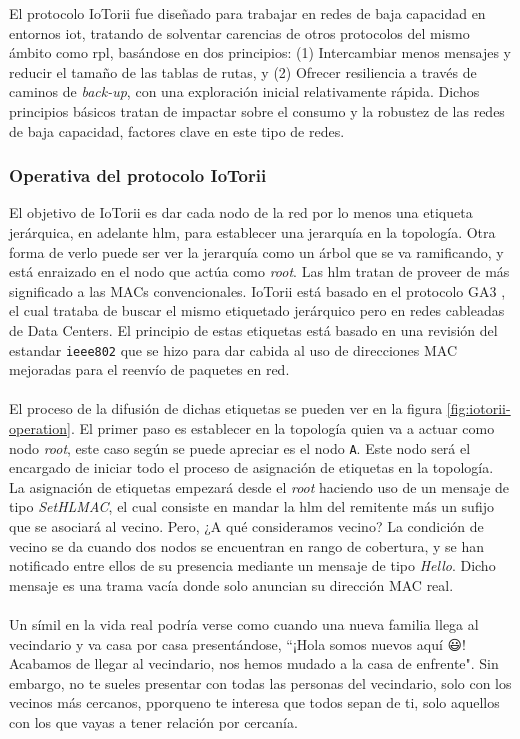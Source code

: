 El protocolo IoTorii fue diseñado para trabajar en redes de baja capacidad en entornos \gls{iot}, tratando de solventar carencias de otros protocolos del mismo ámbito como \gls{rpl}, basándose en dos principios: (1) Intercambiar menos mensajes y reducir el tamaño de las tablas de rutas, y (2) Ofrecer resiliencia a través de caminos de \textit{back-up}, con una exploración inicial relativamente rápida. Dichos principios básicos tratan de impactar sobre el consumo y la robustez de las redes de baja capacidad, factores clave en este tipo de redes.


\subsubsection{Operativa del protocolo IoTorii}

El objetivo de IoTorii es dar cada nodo de la red por lo menos una etiqueta jerárquica, en adelante \gls{hlm}, para establecer una jerarquía en la topología. Otra forma de verlo puede ser ver la jerarquía como un árbol que se va ramificando, y está enraizado en el nodo que actúa como \textit{root}. Las \gls{hlm} tratan de proveer de más significado a las MACs convencionales. IoTorii está basado en el protocolo GA3 \cite{rojas2017ga3}, el cual trataba de buscar el mismo etiquetado jerárquico pero en redes cableadas de Data Centers. El principio de estas etiquetas está basado en una revisión del estandar \texttt{ieee802} que se hizo para dar cabida al uso de direcciones MAC mejoradas para el reenvío de paquetes en red.\\
\\
El proceso de la difusión de dichas etiquetas se pueden ver en la figura \ref{fig:iotorii-operation}. El primer paso es establecer en la topología quien va a actuar como nodo \textit{root}, este caso según se puede apreciar es el nodo \texttt{A}. Este nodo será el encargado de iniciar todo el proceso de asignación de etiquetas en la topología. La asignación de etiquetas empezará desde el \textit{root} haciendo uso de un mensaje de tipo \textit{SetHLMAC}, el cual consiste en mandar la \gls{hlm} del remitente más un sufijo que se asociará al vecino. Pero, ¿A qué consideramos vecino? La condición de vecino se da cuando dos nodos se encuentran en rango de cobertura, y se han notificado entre ellos de su presencia mediante un mensaje de tipo \textit{Hello}. Dicho mensaje es una trama vacía donde solo anuncian su dirección MAC real. \\
\\
Un símil en la vida real podría verse como cuando una nueva familia llega al vecindario y va casa por casa presentándose, ``¡Hola somos nuevos aquí {\DejaSans 😃}! Acabamos de llegar al vecindario, nos hemos mudado a la casa de enfrente". Sin embargo, no te sueles presentar con todas las personas del vecindario, solo con los vecinos más cercanos, pporqueno te interesa que todos sepan de ti, solo aquellos con los que vayas a tener relación por cercanía.\\
